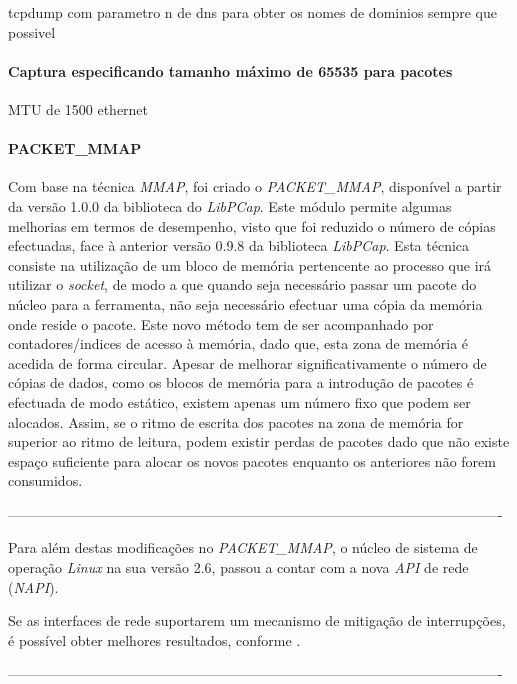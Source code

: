tcpdump com parametro n de dns para obter os nomes de dominios sempre que possivel

\paragraph{Captura especificando tamanho máximo de 65535 para pacotes}

MTU de 1500 ethernet

\paragraph*{PACKET\_MMAP}

Com base na técnica \textit{MMAP}, foi criado o \textit{PACKET\_MMAP}, disponível a partir da versão 1.0.0 da biblioteca do \textit{LibPCap}.
Este módulo permite algumas melhorias em termos de desempenho, visto que foi reduzido o número de cópias efectuadas, face à anterior versão 0.9.8 da biblioteca \textit{LibPCap}.
Esta técnica consiste na utilização de um bloco de memória pertencente ao processo que irá utilizar o \textit{socket}, de modo a que quando seja necessário passar um pacote do núcleo para a ferramenta, não seja necessário efectuar uma cópia da memória onde reside o pacote.
Este novo método tem de ser acompanhado por contadores/indices de acesso à memória, dado que, esta zona de memória é acedida de forma circular.
Apesar de melhorar significativamente o número de cópias de dados, como os blocos de memória para a introdução de pacotes é efectuada de modo estático, existem apenas um número fixo que podem ser alocados.
Assim, se o ritmo de escrita dos pacotes na zona de memória for superior ao ritmo de leitura, podem existir perdas de pacotes dado que não existe espaço suficiente para alocar os novos pacotes enquanto os anteriores não forem consumidos.

----------------------------------------------------------------------------------------------------------

Para além destas modificações no \textit{PACKET\_MMAP}, o núcleo de sistema de operação \textit{Linux} na sua versão 2.6, passou a contar com a nova \textit{API} de rede (\textit{NAPI}).

Se as interfaces de rede suportarem um mecanismo de mitigação de interrupções, é possível obter melhores resultados, conforme \cite{Deri2004}.

----------------------------------------------------------------------------------------------------------

